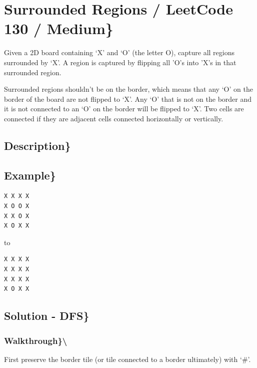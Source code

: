 \documentclass[]{book}
\begin{document}
\hypertarget{surrounded-regions-leetcode-130-medium}{%
\section{Surrounded Regions / LeetCode 130 / Medium\}}\label{surrounded-regions-leetcode-130-medium}}

Given a 2D board containing `X' and `O' (the letter O), capture all regions surrounded by `X'. A region is captured
by flipping all 'O's into 'X's in that surrounded region.

Surrounded regions shouldn't be on the border, which means that any `O' on the border of the board are not flipped to
`X'. Any `O' that is not on the border and it is not connected to an `O' on the border will be flipped to `X'. Two
cells are connected if they are adjacent cells connected horizontally or vertically.

\hypertarget{description-49}{%
\subsection{Description\}}\label{description-49}}

\hypertarget{example-47}{%
\subsection{Example\}}\label{example-47}}

\begin{verbatim}
X X X X
X O O X
X X O X
X O X X
\end{verbatim}

to

\begin{verbatim}
X X X X
X X X X
X X X X
X O X X
\end{verbatim}

\hypertarget{solution---dfs-1}{%
\subsection{Solution - DFS\}}\label{solution---dfs-1}}

\hypertarget{walkthrough-49}{%
\subsubsection{Walkthrough\}\textbackslash{}}\label{walkthrough-49}}

First preserve the border tile (or tile connected to a border ultimately) with `\#'.
\end{document}
